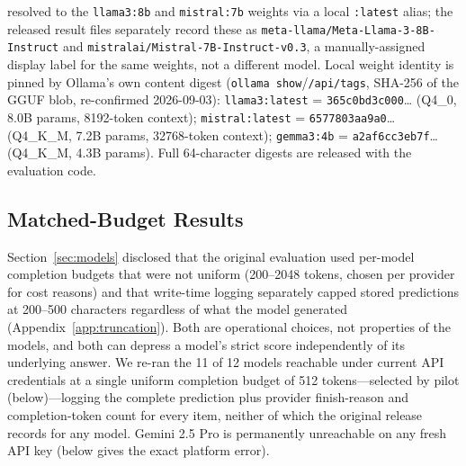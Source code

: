 \begin{table}[t]
{resolved to the \texttt{llama3:8b} and \texttt{mistral:7b} weights via a local \texttt{:latest}
alias; the released result files separately record these as
\texttt{meta-llama/Meta-Llama-3-8B-Instruct} and \texttt{mistralai/Mistral-7B-Instruct-v0.3}, a
manually-assigned display label for the same weights, not a different model. Local weight identity
is pinned by Ollama's own content digest (\texttt{ollama show}/\texttt{/api/tags}, SHA-256 of the
GGUF blob, re-confirmed 2026-09-03): \texttt{llama3:latest} = \texttt{365c0bd3c000}\ldots{} (Q4\_0,
8.0B params, 8192-token context); \texttt{mistral:latest} = \texttt{6577803aa9a0}\ldots{} (Q4\_K\_M,
7.2B params, 32768-token context); \texttt{gemma3:4b} = \texttt{a2af6cc3eb7f}\ldots{} (Q4\_K\_M,
4.3B params). Full 64-character digests are released with the evaluation code.}
\label{tab:models}
\end{table}

\subsection{Matched-Budget Results}
\label{app:matched-budget-results}

Section~\ref{sec:models} disclosed that the original evaluation used per-model completion budgets
that were not uniform (200--2048 tokens, chosen per provider for cost reasons) and that write-time
logging separately capped stored predictions at 200--500 characters regardless of what the model
generated (Appendix~\ref{app:truncation}). Both are operational choices, not properties of the
models, and both can depress a model's strict score independently of its underlying answer. We
re-ran the 11 of 12 models reachable under current API credentials at a single uniform completion
budget of 512 tokens---selected by pilot (below)---logging the complete prediction plus provider
finish-reason and completion-token count for every item, neither of which the original release
records for any model. Gemini 2.5 Pro is permanently unreachable on any fresh API key (below gives
the exact platform error).

\begin{table}[t]
\centering\small

\caption{Strict accuracy under the archived original release (per-model budget, original provider)
versus a re-run at a uniform 512-token budget, same four-stage scorer, same items. The two columns
differ in budget, logging cap, and---for five models---transport (four moved from Groq to
OpenRouter; Gemini 2.5 Flash moved from direct Google AI Studio access to the same model routed
through OpenRouter; text below), so $\Delta$pp is a joint evaluation-configuration effect, not an
isolated budget effect; it is bolded where $|\Delta| \geq 5$. ``Trunc.\ @512'' is the fraction of
matched-run predictions that hit the 512-token cap (\texttt{finish\_reason=length}). Original
completion budgets and truncation rates: Appendix~\ref{app:truncation}.}
\label{tab:matchedbudget}
\end{table}


